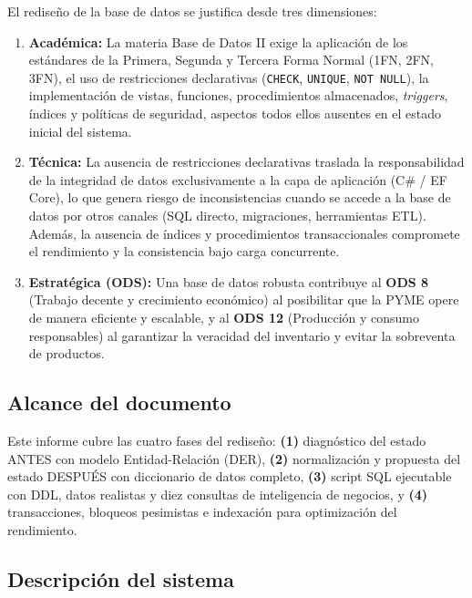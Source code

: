 El rediseño de la base de datos se justifica desde tres dimensiones:

\begin{enumerate}
  \item \textbf{Académica:} La materia Base de Datos II exige la aplicación de los estándares de la Primera, Segunda y Tercera Forma Normal (1FN, 2FN, 3FN), el uso de restricciones declarativas (\texttt{CHECK}, \texttt{UNIQUE}, \texttt{NOT NULL}), la implementación de vistas, funciones, procedimientos almacenados, \textit{triggers}, índices y políticas de seguridad, aspectos todos ellos ausentes en el estado inicial del sistema.

  \item \textbf{Técnica:} La ausencia de restricciones declarativas traslada la responsabilidad de la integridad de datos exclusivamente a la capa de aplicación (C\# / EF Core), lo que genera riesgo de inconsistencias cuando se accede a la base de datos por otros canales (SQL directo, migraciones, herramientas ETL).
  Además, la ausencia de índices y procedimientos transaccionales compromete el rendimiento y la consistencia bajo carga concurrente.

  \item \textbf{Estratégica (ODS):} Una base de datos robusta contribuye al \textbf{ODS 8} (Trabajo decente y crecimiento económico) al posibilitar que la PYME opere de manera eficiente y escalable, y al \textbf{ODS 12} (Producción y consumo responsables) al garantizar la veracidad del inventario y evitar la sobreventa de productos.
\end{enumerate}

\subsection{Alcance del documento}

Este informe cubre las cuatro fases del rediseño:
\textbf{(1)} diagnóstico del estado ANTES con modelo Entidad-Relación (DER),
\textbf{(2)} normalización y propuesta del estado DESPUÉS con diccionario de datos completo,
\textbf{(3)} script SQL ejecutable con DDL, datos realistas y diez consultas de inteligencia de negocios, y
\textbf{(4)} transacciones, bloqueos pesimistas e indexación para optimización del rendimiento.

\subsection{Descripción del sistema}

